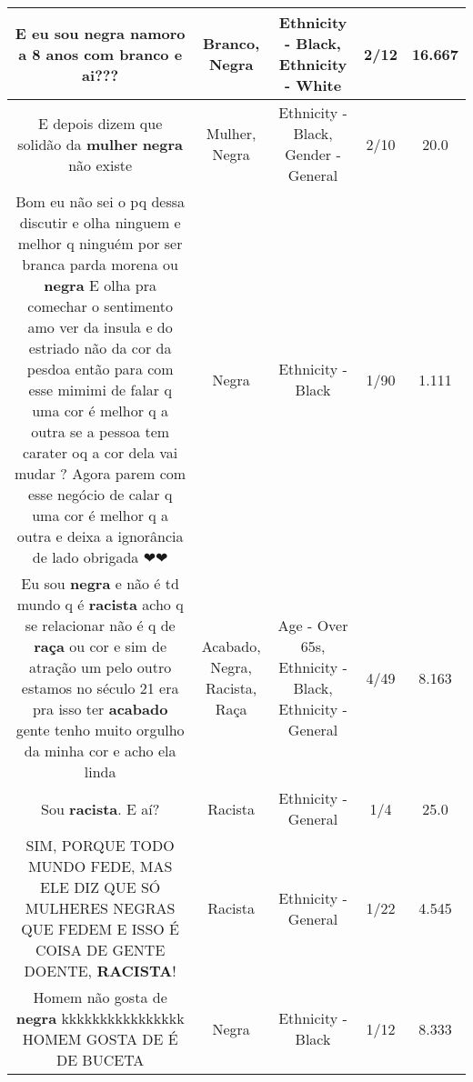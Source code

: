\documentclass[11pt]{article}
\newlength\mylength
\begin{document}
\begin{center}
\begin{longtable}{|C{.65\mylength}|C{.30\mylength}|C{.12\mylength}|C{.12\mylength}|C{.12\mylength}|}
  \small E eu sou \textbf{negra} namoro a 8 anos com \textbf{branco} e ai???\normalsize   & Branco, Negra & Ethnicity - Black, Ethnicity - White & 2/12 & 16.667 \\  \hline
  \small E depois dizem que solidão da \textbf{mulher}  \textbf{negra} não existe\normalsize   & Mulher, Negra & Ethnicity - Black, Gender - General & 2/10 & 20.0 \\  \hline
  \small Bom  eu não  sei o pq dessa discutir  e olha ninguem e melhor q ninguém  por ser branca parda morena ou \textbf{negra}   E olha pra comechar o sentimento amo ver da  insula e  do estriado não  da cor da pesdoa então  para com esse mimimi de falar q uma cor é  melhor q a outra se a pessoa  tem carater oq a cor dela vai mudar ?  Agora parem com esse negócio  de calar q uma cor é  melhor q a outra  e deixa a ignorância  de lado  obrigada  ❤❤\normalsize   & Negra & Ethnicity - Black & 1/90 & 1.111 \\  \hline
  \small Eu sou \textbf{negra} e não é td mundo q é \textbf{racista} acho q se relacionar não é q de \textbf{raça} ou cor e sim de atração um pelo outro  estamos no século 21 era pra isso ter \textbf{acabado} gente tenho muito orgulho da minha cor e acho ela linda\normalsize   & Acabado, Negra, Racista, Raça & Age - Over 65s, Ethnicity - Black, Ethnicity - General & 4/49 & 8.163 \\  \hline
  \small Sou \textbf{racista}. E aí?\normalsize   & Racista & Ethnicity - General & 1/4 & 25.0 \\  \hline
  \small SIM, PORQUE TODO MUNDO FEDE, MAS ELE DIZ QUE SÓ MULHERES NEGRAS QUE FEDEM E ISSO É COISA DE GENTE DOENTE, \textbf{RACISTA}!\normalsize   & Racista & Ethnicity - General & 1/22 & 4.545 \\  \hline
  \small Homem não gosta de \textbf{negra} kkkkkkkkkkkkkkkk  HOMEM GOSTA DE É DE BUCETA\normalsize   & Negra & Ethnicity - Black & 1/12 & 8.333 \\  \hline

\end{longtable}
\end{center}
\end{document}
